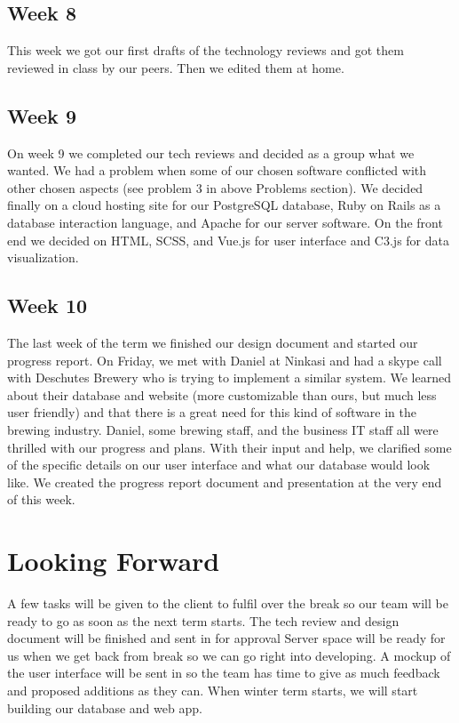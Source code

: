 \documentclass[draftclsnofoot,onecolumn,letterpaper,10pt,compsoc]{IEEEtran}
\begin{document}
\subsection{Week 8}
This week we got our first drafts of the technology reviews and got them reviewed in class by our peers.
Then we edited them at home.
\subsection{Week 9}
On week 9 we completed our tech reviews and decided as a group what we wanted.
We had a problem when some of our chosen software conflicted with other chosen aspects (see problem 3 in above Problems section).
We decided finally on a cloud hosting site for our PostgreSQL database, Ruby on Rails as a database interaction language, and Apache for our server software.
On the front end we decided on HTML, SCSS, and Vue.js for user interface and C3.js for data visualization.
\subsection{Week 10}
The last week of the term we finished our design document and started our progress report.
On Friday, we met with Daniel at Ninkasi and had a skype call with Deschutes Brewery who is trying to implement a similar system.
We learned about their database and website (more customizable than ours, but much less user friendly) and that there is a great need for this kind of software in the brewing industry.
Daniel, some brewing staff, and the business IT staff all were thrilled with our progress and plans.
With their input and help, we clarified some of the specific details on our user interface and what our database would look like.
We created the progress report document and presentation at the very end of this week.
\section{Looking Forward}
A few tasks will be given to the client to fulfil over the break so our team will be ready to go as soon as the next term starts.
The tech review and design document will be finished and sent in for approval
Server space will be ready for us when we get back from break so we can go right into developing.
A mockup of the user interface will be sent in so the team has time to give as much feedback and proposed additions as they can.
When winter term starts, we will start building our database and web app.
\end{document}
